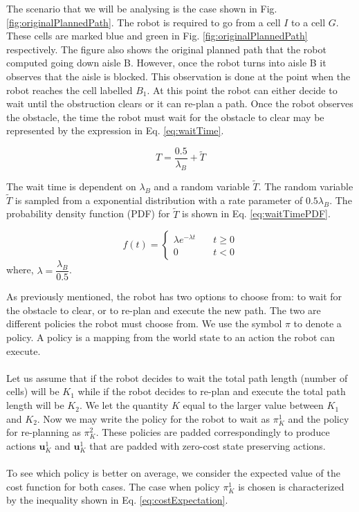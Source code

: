 \documentclass[a4paper,12pt]{article}
\begin{document}
			The scenario that we will be analysing is the case shown in Fig. \ref{fig:originalPlannedPath}. The robot is required to go from a cell $I$ to a cell $G$. These cells are marked blue and green in Fig. \ref{fig:originalPlannedPath} respectively. The figure also shows the original planned path that the robot computed going down aisle B. However, once the robot turns into aisle B it observes that the aisle is blocked. This observation is done at the point when the robot reaches the cell labelled $B_{1}$. At this point the robot can either decide to wait until the obstruction clears or it can re-plan a path. Once the robot observes the obstacle, the time the robot must wait for the obstacle to clear may be represented by the expression in Eq. \ref{eq:waitTime}. 

			\begin{equation}
				T=\frac{0.5}{\lambda_{B}}+\widetilde{T}
				\label{eq:waitTime}
			\end{equation}

			The wait time is dependent on $\lambda_{B}$ and a random variable $\widetilde{T}$. The random variable $\widetilde{T}$ is sampled from a exponential distribution with a rate parameter of $0.5\lambda_{B}$. The probability density function (PDF) for $\widetilde{T}$ is shown in Eq. \ref{eq:waitTimePDF}. 

			\begin{equation}
				f(t) = 
				\begin{cases}
				\lambda e^{-\lambda t} & \quad t \geq 0 \\
				0 & \quad t < 0
				\end{cases}
				\label{eq:waitTimePDF}
			\end{equation}
			where, $\lambda = \dfrac{\lambda_{B}}{0.5}$. 
			
			As previously mentioned, the robot has two options to choose from: to wait for the obstacle to clear, or to re-plan and execute the new path. The two are different policies the robot must choose from. We use the symbol $\pi$ to denote a policy. A policy is a mapping from the world state to an action the robot can execute.
			\\
			\\
			Let us assume that if the robot decides to wait the total path length (number of cells) will be $K_1$ while if the robot decides to re-plan and execute the total path length will be $K_2$. We let the quantity $K$ equal to the larger value between $K_1$ and $K_2$. Now we may write the policy for the robot to wait as $\pi_{K}^{1}$ and the policy for re-planning as $\pi_{K}^{2}$. These policies are padded correspondingly to produce actions $\textbf{u}_{K}^{1}$ and $\textbf{u}_{K}^{1}$ that are padded with zero-cost state preserving actions.
			\\
			\\
			To see which policy is better on average, we consider the expected value of the cost function for both cases. The case when policy $\pi_{K}^{1}$ is chosen is characterized by the inequality shown in Eq. \ref{eq:costExpectation}.
\end{document}
